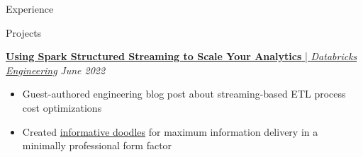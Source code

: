 \documentclass{resume/resume}
\begin{document}
\begin{rSection}{Experience}
  
\end{rSection}

\begin{rSection}{Projects}
  
  
  \href{https://databricks.com/blog/2022/07/14/using-spark-structured-streaming-to-scale-your-analytics.html}{{\bf Using Spark Structured Streaming to Scale Your Analytics} | {\em Databricks Engineering}} \hfill {\em June 2022}
  \vspace{-6pt}
  \begin{itemize}[nosep]
    \item Guest-authored engineering blog post about streaming-based ETL process cost optimizations
    \item Created \href{https://www.databricks.com/blog/2022/07/14/using-spark-structured-streaming-to-scale-your-analytics.html#:~:text=With\%20your\%20new\%20aggregated\%20data\%2C\%20you\%20can\%20throw\%20together\%20a\%20nice\%20visualization\%20to\%20do...\%20business\%20things.}{informative doodles} for maximum information delivery in a minimally professional form factor
  \end{itemize}


\end{rSection}
\end{document}
